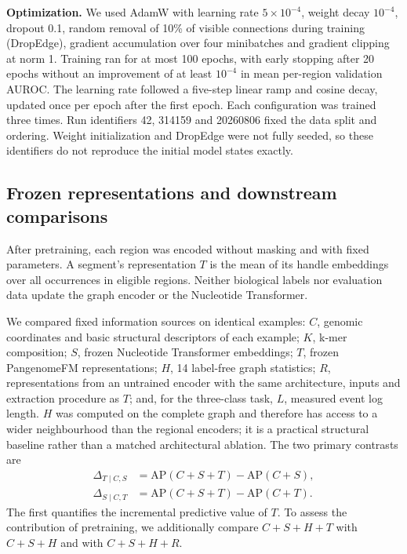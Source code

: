 \documentclass[11pt]{article}
\newcommand{\method}{PangenomeFM\xspace}
\begin{document}
\begin{bibunit}[unsrtnat]
\textbf{Optimization.} We used AdamW\cite{loshchilov2019adamw} with learning rate $5\times10^{-4}$, weight decay $10^{-4}$, dropout 0.1, random removal of 10\% of visible connections during training (DropEdge), gradient accumulation over four minibatches and gradient clipping at norm 1. Training ran for at most 100 epochs, with early stopping after 20 epochs without an improvement of at least $10^{-4}$ in mean per-region validation AUROC. The learning rate followed a five-step linear ramp and cosine decay, updated once per epoch after the first epoch. Each configuration was trained three times. Run identifiers 42, 314159 and 20260806 fixed the data split and ordering. Weight initialization and DropEdge were not fully seeded, so these identifiers do not reproduce the initial model states exactly.

\subsection{Frozen representations and downstream comparisons}
\label{sec:frozen-reuse}

After pretraining, each region was encoded without masking and with fixed parameters. A segment's representation $T$ is the mean of its handle embeddings over all occurrences in eligible regions. Neither biological labels nor evaluation data update the graph encoder or the Nucleotide Transformer.

We compared fixed information sources on identical examples: $C$, genomic coordinates and basic structural descriptors of each example; $K$, k-mer composition; $S$, frozen Nucleotide Transformer embeddings; $T$, frozen \method representations; $H$, 14 label-free graph statistics; $R$, representations from an untrained encoder with the same architecture, inputs and extraction procedure as $T$; and, for the three-class task, $L$, measured event log length. $H$ was computed on the complete graph and therefore has access to a wider neighbourhood than the regional encoders; it is a practical structural baseline rather than a matched architectural ablation. The two primary contrasts are
\begin{align}
\Delta_{T\mid C,S}&=\mathrm{AP}(C+S+T)-\mathrm{AP}(C+S),\\
\Delta_{S\mid C,T}&=\mathrm{AP}(C+S+T)-\mathrm{AP}(C+T).
\end{align}
The first quantifies the incremental predictive value of $T$. To assess the contribution of pretraining, we additionally compare $C+S+H+T$ with $C+S+H$ and with $C+S+H+R$.


\end{bibunit}
\end{document}

